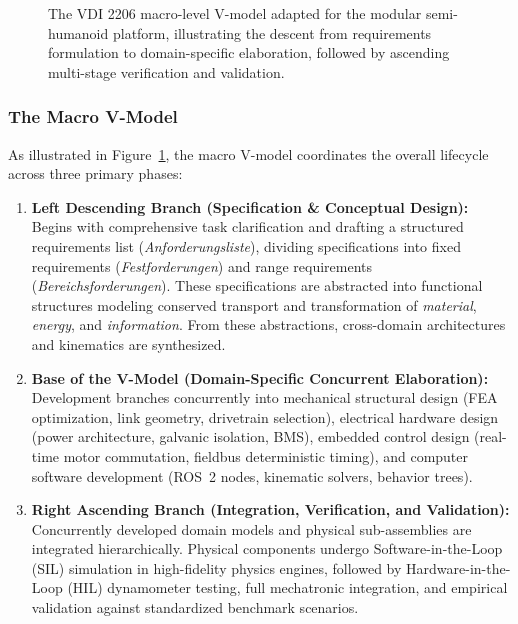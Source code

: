 \begin{figure}[htbp]
{%
}
\caption{The VDI 2206 macro-level V-model adapted for the modular semi-humanoid platform, illustrating the descent from requirements formulation to domain-specific elaboration, followed by ascending multi-stage verification and validation.}
\label{fig:vdi2206_vmodel}
\end{figure}

\subsubsection{The Macro V-Model}
As illustrated in Figure~\ref{fig:vdi2206_vmodel}, the macro V-model coordinates the overall lifecycle across three primary phases:
\begin{enumerate}[leftmargin=1.5em]
  \item \textbf{Left Descending Branch (Specification \& Conceptual Design):} Begins with comprehensive task clarification and drafting a structured requirements list (\emph{Anforderungsliste}), dividing specifications into fixed requirements (\emph{Festforderungen}) and range requirements (\emph{Bereichsforderungen}). These specifications are abstracted into functional structures modeling conserved transport and transformation of \emph{material}, \emph{energy}, and \emph{information}. From these abstractions, cross-domain architectures and kinematics are synthesized.
  \item \textbf{Base of the V-Model (Domain-Specific Concurrent Elaboration):} Development branches concurrently into mechanical structural design (FEA optimization, link geometry, drivetrain selection), electrical hardware design (power architecture, galvanic isolation, BMS), embedded control design (real-time motor commutation, fieldbus deterministic timing), and computer software development (ROS~2 nodes, kinematic solvers, behavior trees).
  \item \textbf{Right Ascending Branch (Integration, Verification, and Validation):} Concurrently developed domain models and physical sub-assemblies are integrated hierarchically. Physical components undergo Software-in-the-Loop (SIL) simulation in high-fidelity physics engines, followed by Hardware-in-the-Loop (HIL) dynamometer testing, full mechatronic integration, and empirical validation against standardized benchmark scenarios.
\end{enumerate}

